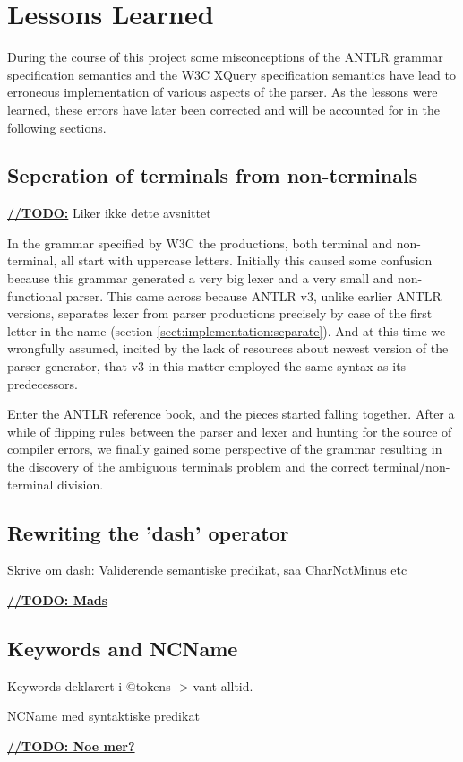 \section{Lessons Learned}
\label{sect:discussion:deadEnds}

During the course of this project some misconceptions of the ANTLR grammar specification semantics and the W3C XQuery specification semantics have lead to erroneous implementation of various aspects of the parser. As the lessons were learned, these errors have later been corrected and will be accounted for in the following sections.

\subsection{Seperation of terminals from non-terminals }
\underline{\textbf{\LARGE //TODO:}} Liker ikke dette avsnittet

In the grammar specified by W3C the productions, both terminal and non-terminal, all start with uppercase letters. Initially this caused some confusion because this grammar generated a very big lexer and a very small and non-functional parser. This came across because ANTLR v3, unlike earlier ANTLR versions, separates lexer from parser productions precisely by case of the first letter in the name (section \ref{sect:implementation:separate}). And at this time we wrongfully assumed, incited by the lack of resources about newest version of the parser generator, that v3 in this matter employed the same syntax as its predecessors.

Enter the ANTLR reference book\cite{definitiveAntlr}, and the pieces started falling together. After a while of flipping rules between the parser and lexer and hunting for the source of compiler errors, we finally gained some perspective of the grammar resulting in the discovery of the ambiguous terminals problem and the correct terminal/non-terminal division.

\subsection{Rewriting the 'dash' operator}

Skrive om dash: Validerende semantiske predikat, saa CharNotMinus etc

\underline{\textbf{\LARGE //TODO: Mads}}
\subsection{Keywords and NCName}
Keywords deklarert i @tokens -> vant alltid.

NCName med syntaktiske predikat

\underline{\textbf{\LARGE //TODO: Noe mer?}}